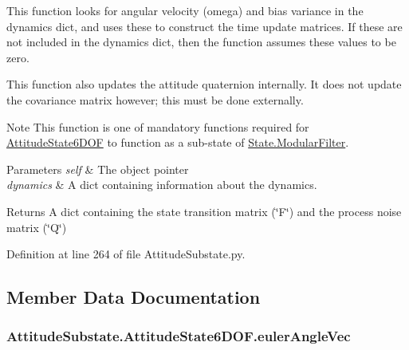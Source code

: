 This function looks for angular velocity (omega) and bias variance in the dynamics dict, and uses these to construct the time update matrices. If these are not included in the dynamics dict, then the function assumes these values to be zero.

This function also updates the attitude quaternion internally. It does not update the covariance matrix however; this must be done externally.

\begin{DoxyNote}{Note}
This function is one of mandatory functions required for \hyperlink{classAttitudeSubstate_1_1AttitudeState6DOF}{Attitude\+State6\+D\+OF} to function as a sub-\/state of \hyperlink{classState_1_1ModularFilter}{State.\+Modular\+Filter}.
\end{DoxyNote}

\begin{DoxyParams}{Parameters}
{\em self} & The object pointer \\
\hline
{\em dynamics} & A dict containing information about the dynamics.\\
\hline
\end{DoxyParams}
\begin{DoxyReturn}{Returns}
A dict containing the state transition matrix (\char`\"{}\+F\char`\"{}) and the process noise matrix (\char`\"{}\+Q\char`\"{}) 
\end{DoxyReturn}


Definition at line 264 of file Attitude\+Substate.\+py.



\subsection{Member Data Documentation}
\subsubsection[{\texorpdfstring{euler\+Angle\+Vec}{eulerAngleVec}}]{\setlength{\rightskip}{0pt plus 5cm}Attitude\+Substate.\+Attitude\+State6\+D\+O\+F.\+euler\+Angle\+Vec}\hypertarget{classAttitudeSubstate_1_1AttitudeState6DOF_af87f4ef871d05fbd84e7e7c91a2865a3}{}\label{classAttitudeSubstate_1_1AttitudeState6DOF_af87f4ef871d05fbd84e7e7c91a2865a3}


